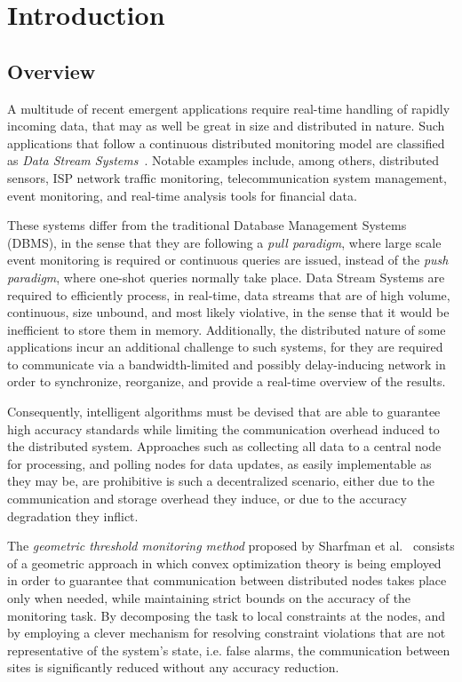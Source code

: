 \chapter{Introduction} \label{chap:intro}
\section{Overview} \label{sec:intro-overview}


A multitude of recent emergent applications require real-time handling of rapidly incoming data, that may as well be great in size and distributed in nature. Such applications that follow a continuous distributed monitoring model are classified as \emph{Data Stream Systems}~\cite{Babcock2002DataStreamSystems}. Notable examples include, among others, distributed sensors, ISP network traffic monitoring, telecommunication system management, event monitoring, and real-time analysis tools for financial data.

These systems differ from the traditional Database Management Systems (DBMS), in the sense that they are following a \emph{pull paradigm}, where large scale event monitoring is required or continuous queries are issued, instead of the \emph{push paradigm}, where one-shot queries normally take place. Data Stream Systems are required to efficiently process, in real-time, data streams that are of high volume, continuous, size unbound, and most likely violative, in the sense that it would be inefficient to store them in memory. Additionally, the distributed nature of some applications incur an additional challenge to such systems, for they are required to communicate via a bandwidth-limited and possibly delay-inducing network in order to synchronize, reorganize, and provide a real-time overview of the results.

Consequently, intelligent algorithms must be devised that are able to guarantee high accuracy standards while limiting the communication overhead induced to the distributed system. Approaches such as collecting all data to a central node for processing, and polling nodes for data updates, as easily implementable as they may be, are prohibitive is such a decentralized scenario, either due to the communication and storage overhead they induce, or due to the accuracy degradation they inflict. 

The \emph{geometric threshold monitoring method} proposed by Sharfman et al.~\cite{Sharfman2006GM} consists of a geometric approach in which convex optimization theory is being employed in order to guarantee that communication between distributed nodes takes place only when needed, while maintaining strict bounds on the accuracy of the monitoring task. By decomposing the task to local constraints at the  nodes, and by employing a clever mechanism for resolving constraint violations that are not representative of the system's state, i.e. false alarms, the communication between sites is significantly reduced without any accuracy reduction.

